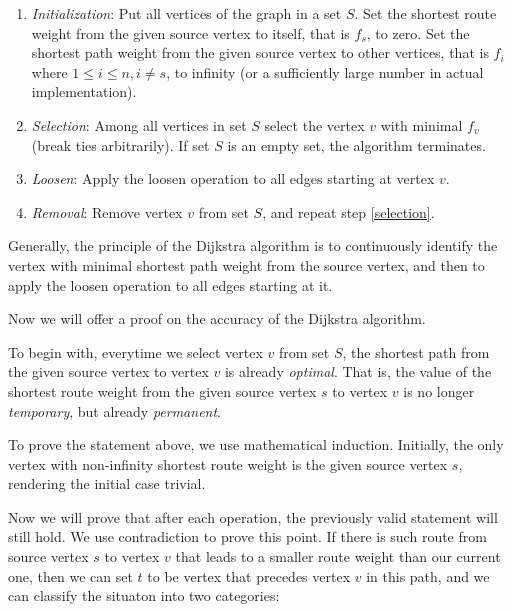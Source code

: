 \documentclass[a4paper,11pt,twocolumn]{article}
\begin{document}
\begin{enumerate}

\item{\emph{Initialization}: Put all vertices of the graph in a set $S$. Set the shortest route weight from the given source vertex to itself, that is $f_s$, to zero. Set the shortest path weight from the given source vertex to other vertices, that is $f_i$ where $1\le i \le n,i\ne s$, to infinity (or a sufficiently large number in actual implementation). }

\item{\label{selection}\emph{Selection}: Among all vertices in set $S$  select the vertex $v$ with minimal $f_v$ (break ties arbitrarily). If set $S$ is an empty set, the algorithm terminates. }

\item{\emph{Loosen}: Apply the loosen operation to all edges starting at vertex $v$. }

\item{\emph{Removal}: Remove vertex $v$ from set $S$, and repeat step \ref{selection}. }

\end{enumerate}

Generally, the principle of the Dijkstra algorithm is to continuously identify the vertex with minimal shortest path weight from the source vertex, and then to apply the loosen operation to all edges starting at it.

Now we will offer a proof on the accuracy of the Dijkstra algorithm.

To begin with, everytime we select vertex $v$ from set $S$, the shortest path from the given source vertex to vertex $v$ is already \emph{optimal}. That is, the value of the shortest route weight from the given source vertex $s$ to vertex $v$ is no longer \emph{temporary}, but already \emph{permanent}.

To prove the statement above, we use mathematical induction. Initially, the only vertex with non-infinity shortest route weight is the given source vertex $s$, rendering the initial case trivial.

Now we will prove that after each operation, the previously valid statement will still hold. We use contradiction to prove this point. If there is such route from source vertex $s$ to vertex $v$ that leads to a smaller route weight than our current one, then we can set $t$ to be vertex that precedes vertex $v$ in this path, and we can classify the situaton into two categories:
\end{document}
